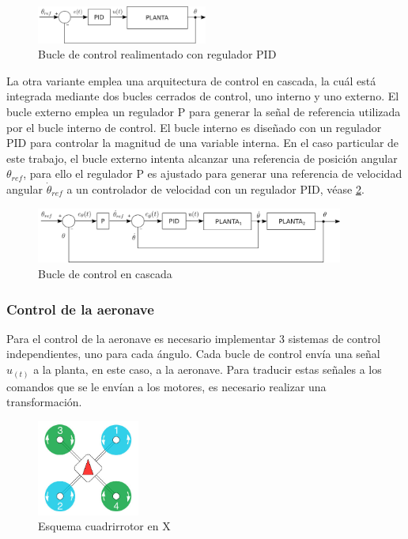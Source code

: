 \begin{figure}[htb!]
	\centering
	\includegraphics[width=0.5\textwidth]{background/PID_loop}
	\caption{Bucle de control realimentado con regulador PID}
	\label{PID_loop}
\end{figure}

La otra variante emplea una arquitectura de control en cascada, la cuál está integrada mediante dos bucles cerrados de control, uno interno y uno externo. El bucle externo emplea un regulador P para generar la señal de referencia utilizada por el bucle interno de control. El bucle interno es diseñado con un regulador PID para controlar la magnitud de una variable interna. En el caso particular de este trabajo, el bucle externo intenta alcanzar una referencia de posición angular $\theta_{ref}$, para ello el regulador P es ajustado para generar una referencia de velocidad angular $\dot \theta_{ref}$ a un controlador de velocidad con un regulador PID, véase \cref{PID_cascade_loop}.


\begin{figure}[htb!]
	\centering
	\includegraphics[width=0.9\textwidth]{background/PID_cascade_loop}
	\caption{Bucle de control en cascada}
	\label{PID_cascade_loop}
\end{figure}


\subsubsection{Control de la aeronave }
Para el control de la aeronave es necesario implementar 3 sistemas de control independientes, uno para cada ángulo. Cada bucle de control envía una señal $u_(t)$ a la planta, en este caso, a la aeronave. Para traducir estas señales a los comandos que se le envían a los motores, es necesario realizar una transformación. 


\begin{figure}[htb!]
	\centering
	\includegraphics[width=0.3\textwidth]{introduccion/cuadrirrotorX.jpeg}
	\caption{Esquema cuadrirrotor en X}
	\label{Drone_en_X_Q}
\end{figure}


